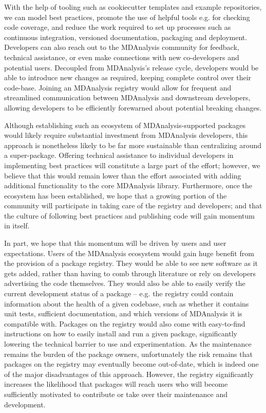 \documentclass{article}
\begin{document}
With the help of tooling such as cookiecutter templates and example repositories, we can model best practices, promote the use of helpful tools e.g. for checking code coverage, and reduce the work required to set up processes such as continuous integration, versioned documentation, packaging and deployment. Developers can also reach out to the MDAnalysis community for feedback, technical assistance, or even make connections with new co-developers and potential users. Decoupled from MDAnalysis’s release cycle, developers would be able to introduce new changes as required, keeping complete control over their code-base. Joining an MDAnalysis registry would allow for frequent and streamlined communication between MDAnalysis and downstream developers, allowing developers to be efficiently forewarned about potential breaking changes.

Although establishing such an ecosystem of MDAnalysis-supported packages would likely require substantial investment from MDAnalysis developers, this approach is nonetheless likely to be far more sustainable than centralizing around a super-package. Offering technical assistance to individual developers in implementing best practices will constitute a large part of the effort; however, we believe that this would remain lower than the effort associated with adding additional functionality to the core MDAnalysis library. Furthermore, once the ecosystem has been established, we hope that a growing portion of the community will participate in taking care of the registry and developers; and that the culture of following best practices and publishing code will gain momentum in itself. 

In part, we hope that this momentum will be driven by users and user expectations. Users of the MDAnalysis ecosystem would gain huge benefit from the provision of a package registry. They would be able to see new software as it gets added, rather than having to comb through literature or rely on developers advertising the code themselves. They would also be able to easily verify the current development status of a package – e.g. the registry could contain information about the health of a given codebase, such as whether it contains unit tests, sufficient documentation, and which versions of MDAnalysis it is compatible with. Packages on the registry would also come with easy-to-find instructions on how to easily install and run a given package, significantly lowering the technical barrier to use and experimentation. As the maintenance remains the burden of the package owners, unfortunately the risk remains that packages on the registry may eventually become out-of-date, which is indeed one of the major disadvantages of this approach. However, the registry significantly increases the likelihood that packages will reach users who will become sufficiently motivated to contribute or take over their maintenance and development.
\end{document}
